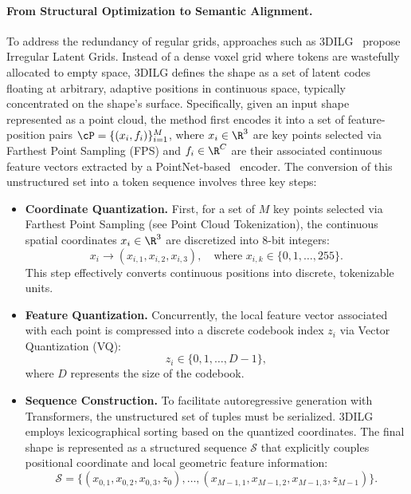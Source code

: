 \documentclass[../../book-main.tex]{subfiles}
\begin{document}
\paragraph{From Structural Optimization to Semantic Alignment.}
To address the redundancy of regular grids, approaches such as 
3DILG~\citep{zhang20223dilg} propose Irregular Latent Grids.
Instead of a dense voxel grid where tokens are wastefully 
allocated to empty space, 3DILG defines the shape as a set 
of latent codes floating at arbitrary, adaptive positions 
in continuous space, typically concentrated on the shape's surface.
Specifically, given an input shape represented as a point cloud, the method first encodes it into a set of feature-position pairs \(\cP = \{(x_i, f_i)\}_{i=1}^M\), where \(x_i \in \R^3\) are key points selected via Farthest Point Sampling (FPS) and \(f_i \in \R^C\) are their associated continuous feature vectors extracted by a PointNet-based~\citep{qi2017pointnet} encoder.
The conversion of this unstructured set into a token sequence involves three key steps:
\begin{itemize}
\item \textbf{Coordinate Quantization.} First, for a set of \(M\) key points selected via Farthest Point Sampling (see Point Cloud Tokenization), the continuous spatial coordinates \(x_i \in \R^3\) are discretized into 8-bit integers:
\begin{equation}
x_i \to (x_{i,1}, x_{i,2}, x_{i,3}), \quad \text{where } x_{i,k} \in \{0, 1, \dots, 255\} .
\end{equation}
This step effectively converts continuous positions into discrete, tokenizable units.
\item \textbf{Feature Quantization.} Concurrently, the local feature vector associated with each point is compressed into a discrete codebook index \(z_i\) via Vector Quantization (VQ):
\begin{equation}
    z_i \in \{0, 1, \dots, D-1\} ,
\end{equation}
where \(D\) represents the size of the codebook.
\item \textbf{Sequence Construction.} To facilitate autoregressive generation with Transformers, the unstructured set of tuples must be serialized.
3DILG employs lexicographical sorting based on the quantized coordinates. The final shape is represented as a structured sequence \(\mathcal{S}\) that explicitly couples positional coordinate and local geometric feature information:
\begin{equation}
    \mathcal{S} = \big\{ (x_{0,1}, x_{0,2}, x_{0,3}, z_0), \dots, (x_{M-1,1}, x_{M-1,2}, x_{M-1,3}, z_{M-1}) \big\} .
\end{equation}
\end{itemize}
\end{document}
